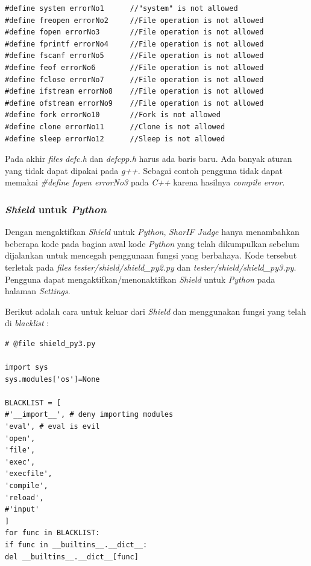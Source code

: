 \documentclass[a4paper,twoside]{article}
\begin{document}
\begin{enumerate}
\begin{lstlisting}[basicstyle=\ttfamily, frame=single,
		columns=fullflexible, keepspaces=true, breaklines=true, label=ls:20]
#define system errorNo1      //"system" is not allowed
#define freopen errorNo2     //File operation is not allowed
#define fopen errorNo3       //File operation is not allowed
#define fprintf errorNo4     //File operation is not allowed
#define fscanf errorNo5      //File operation is not allowed
#define feof errorNo6        //File operation is not allowed
#define fclose errorNo7      //File operation is not allowed
#define ifstream errorNo8    //File operation is not allowed
#define ofstream errorNo9    //File operation is not allowed
#define fork errorNo10       //Fork is not allowed
#define clone errorNo11      //Clone is not allowed
#define sleep errorNo12      //Sleep is not allowed
		\end{lstlisting}
		
		Pada akhir \textit{files} \textit{defc.h} dan \textit{defcpp.h} harus ada baris baru. Ada banyak aturan yang tidak dapat dipakai pada \textit{g++}. Sebagai contoh pengguna tidak dapat memakai \textit{\#define fopen errorNo3} pada \textit{C++} karena hasilnya \textit{compile error}.
		
		\subsubsection*{\textit{Shield} untuk \textit{Python}}
		\label{subsubsec:shield_python}
		Dengan mengaktifkan \textit{Shield} untuk \textit{Python}, \textit{SharIF Judge} hanya menambahkan beberapa kode pada bagian awal kode \textit{Python} yang telah dikumpulkan sebelum dijalankan untuk mencegah penggunaan fungsi yang berbahaya. Kode tersebut terletak pada \textit{files} \textit{tester/shield/shield\_py2.py} dan \textit{tester/shield/shield\_py3.py}. Pengguna dapat mengaktifkan/menonaktifkan \textit{Shield} untuk \textit{Python} pada halaman \textit{Settings}.
		
		Berikut adalah cara untuk keluar dari \textit{Shield} dan menggunakan fungsi yang telah di \textit{blacklist} :
		
		\begin{lstlisting}[basicstyle=\ttfamily, frame=single,
		columns=fullflexible, keepspaces=true, breaklines=true, label=ls:21]
# @file shield_py3.py

import sys
sys.modules['os']=None

BLACKLIST = [
#'__import__', # deny importing modules
'eval', # eval is evil
'open',
'file',
'exec',
'execfile',
'compile',
'reload',
#'input'
]
for func in BLACKLIST:
if func in __builtins__.__dict__:
del __builtins__.__dict__[func]
		\end{lstlisting}
		

\end{enumerate}
\end{document}
